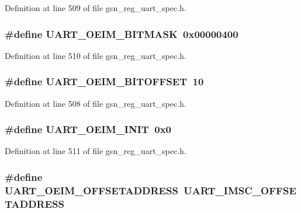 Definition at line 509 of file gsn\_\-reg\_\-uart\_\-spec.h.

\hypertarget{a00575_ae63c7ba3ecc425f52e2b196dfcebd7f5}{
\subsubsection[{UART\_\-OEIM\_\-BITMASK}]{\setlength{\rightskip}{0pt plus 5cm}\#define UART\_\-OEIM\_\-BITMASK~0x00000400}}
\label{a00575_ae63c7ba3ecc425f52e2b196dfcebd7f5}


Definition at line 510 of file gsn\_\-reg\_\-uart\_\-spec.h.

\hypertarget{a00575_aa9110947398d4d24966ab05c3757cc15}{
\subsubsection[{UART\_\-OEIM\_\-BITOFFSET}]{\setlength{\rightskip}{0pt plus 5cm}\#define UART\_\-OEIM\_\-BITOFFSET~10}}
\label{a00575_aa9110947398d4d24966ab05c3757cc15}


Definition at line 508 of file gsn\_\-reg\_\-uart\_\-spec.h.

\hypertarget{a00575_af6ad451565a7f056396b8437a0c54279}{
\subsubsection[{UART\_\-OEIM\_\-INIT}]{\setlength{\rightskip}{0pt plus 5cm}\#define UART\_\-OEIM\_\-INIT~0x0}}
\label{a00575_af6ad451565a7f056396b8437a0c54279}


Definition at line 511 of file gsn\_\-reg\_\-uart\_\-spec.h.

\hypertarget{a00575_abd191022583aff98a76916083d18f99b}{
\subsubsection[{UART\_\-OEIM\_\-OFFSETADDRESS}]{\setlength{\rightskip}{0pt plus 5cm}\#define UART\_\-OEIM\_\-OFFSETADDRESS~UART\_\-IMSC\_\-OFFSETADDRESS}}
\label{a00575_abd191022583aff98a76916083d18f99b}


